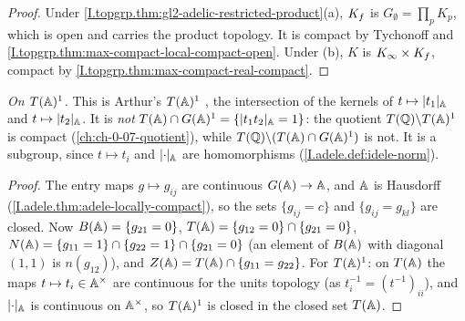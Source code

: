 \begin{theorem}
\end{theorem}
\begin{proof}
Under \cref{I.topgrp.thm:gl2-adelic-restricted-product}(a), $K_f$ is $G_\emptyset=\prod_pK_p$, which is open and carries
the product topology. It is compact by Tychonoff and \cref{I.topgrp.thm:max-compact-local-compact-open}. Under (b), $K$
is $K_\infty\times K_f$, compact by \cref{I.topgrp.thm:max-compact-real-compact}.
\end{proof}

\begin{definition}
\end{definition}
\noindent\emph{On $T(\mathbb{A})^1$.} This is Arthur's $T(\mathbb{A})^1$ \cite[§§2, 7]{AIntro}, the intersection of the kernels of
$t\mapsto\lvert t_1\rvert_{\mathbb{A}}$ and $t\mapsto\lvert t_2\rvert_{\mathbb{A}}$. It is \emph{not} $T(\mathbb{A})\cap G(\mathbb{A})^1=\{\lvert t_1t_2\rvert_{\mathbb{A}}=1\}$: the
quotient $T(\mathbb{Q})\backslash T(\mathbb{A})^1$ is compact (\cref{ch:ch-0-07-quotient}), while $T(\mathbb{Q})\backslash(T(\mathbb{A})\cap G(\mathbb{A})^1)$
is not. It is a subgroup, since $t\mapsto t_i$ and $\lvert\cdot\rvert_{\mathbb{A}}$ are homomorphisms (\cref{I.adele.def:idele-norm}).

\begin{theorem}
\end{theorem}
\begin{proof}
The entry maps $g\mapsto g_{ij}$ are continuous $G(\mathbb{A})\to\mathbb{A}$, and $\mathbb{A}$ is Hausdorff
(\cref{I.adele.thm:adele-locally-compact}), so the sets $\{g_{ij}=c\}$ and $\{g_{ij}=g_{kl}\}$ are closed. Now
$B(\mathbb{A})=\{g_{21}=0\}$, $T(\mathbb{A})=\{g_{12}=0\}\cap\{g_{21}=0\}$, $N(\mathbb{A})=\{g_{11}=1\}\cap\{g_{22}=1\}\cap\{g_{21}=0\}$ (an
element of $B(\mathbb{A})$ with diagonal $(1,1)$ is $n(g_{12})$), and $Z(\mathbb{A})=T(\mathbb{A})\cap\{g_{11}=g_{22}\}$. For $T(\mathbb{A})^1$: on $T(\mathbb{A})$
the maps $t\mapsto t_i\in\mathbb{A}^\times$ are continuous for the units topology (as $t_i^{-1}=(t^{-1})_{ii}$), and
$\lvert\cdot\rvert_{\mathbb{A}}$ is continuous on $\mathbb{A}^\times$, so $T(\mathbb{A})^1$ is closed in the closed set $T(\mathbb{A})$.
\end{proof}

